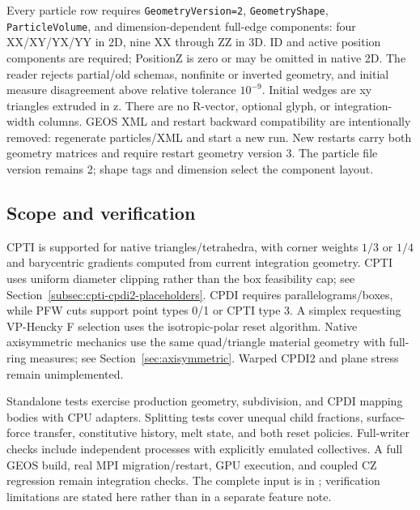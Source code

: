 Every particle row requires \texttt{GeometryVersion=2}, \texttt{GeometryShape},
\texttt{ParticleVolume}, and dimension-dependent full-edge components: four XX/XY/YX/YY in 2D,
nine XX through ZZ in 3D. ID and active position components are required;
PositionZ is zero or may be omitted in native 2D. The reader
rejects partial/old schemas, nonfinite or inverted geometry, and initial measure
disagreement above relative tolerance $10^{-9}$. Initial wedges are xy triangles
extruded in z. There are no R-vector, optional glyph, or integration-width
columns. GEOS XML and restart backward compatibility are intentionally removed:
regenerate particles/XML and start a new run. New restarts carry both geometry
matrices and require restart geometry version 3. The particle file version
remains 2; shape tags and dimension select the component layout.

\subsection{Scope and verification}
CPTI is supported for native triangles/tetrahedra, with corner weights $1/3$ or $1/4$ and
barycentric gradients computed from current integration geometry. CPTI uses
uniform diameter clipping rather than the box feasibility cap; see
Section~\ref{subsec:cpti-cpdi2-placeholders}. CPDI requires parallelograms/boxes, while PFW cuts
support point types 0/1 or CPTI type 3. A simplex requesting VP-Hencky F selection uses the isotropic-polar reset algorithm. Native axisymmetric mechanics use the same quad/triangle material geometry with full-ring measures; see Section~\ref{sec:axisymmetric}. Warped CPDI2 and plane stress remain unimplemented.

Standalone tests exercise production geometry, subdivision, and CPDI mapping bodies with CPU adapters. Splitting tests cover unequal child fractions, surface-force transfer, constitutive history, melt state, and both reset policies. Full-writer checks include independent processes with explicitly emulated collectives. A full GEOS build, real MPI migration/restart, GPU execution, and coupled CZ regression remain integration checks. The complete input is in ; verification limitations are stated here rather than in a separate feature note.
